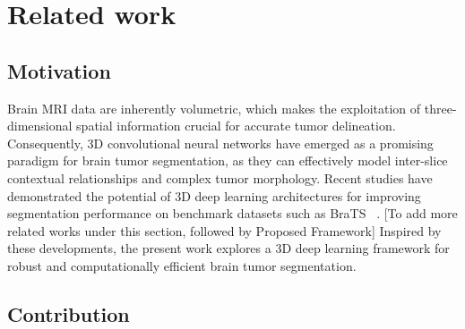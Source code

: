 
\section{Related work}

\subsection{Motivation}

Brain MRI data are inherently volumetric, which makes the exploitation of three-dimensional spatial information crucial for accurate tumor delineation. Consequently, 3D convolutional neural networks have emerged as a promising paradigm for brain tumor segmentation, as they can effectively model inter-slice contextual relationships and complex tumor morphology. Recent studies have demonstrated the potential of 3D deep learning architectures for improving segmentation performance on benchmark datasets such as BraTS ~\cite{abidin2024recent,krishnapriya2023survey,zhang2024etunet}. [To add more related works under this section, followed by Proposed Framework] Inspired by these developments, the present work explores a 3D deep learning framework for robust and computationally efficient brain tumor segmentation.

\subsection{Contribution}
